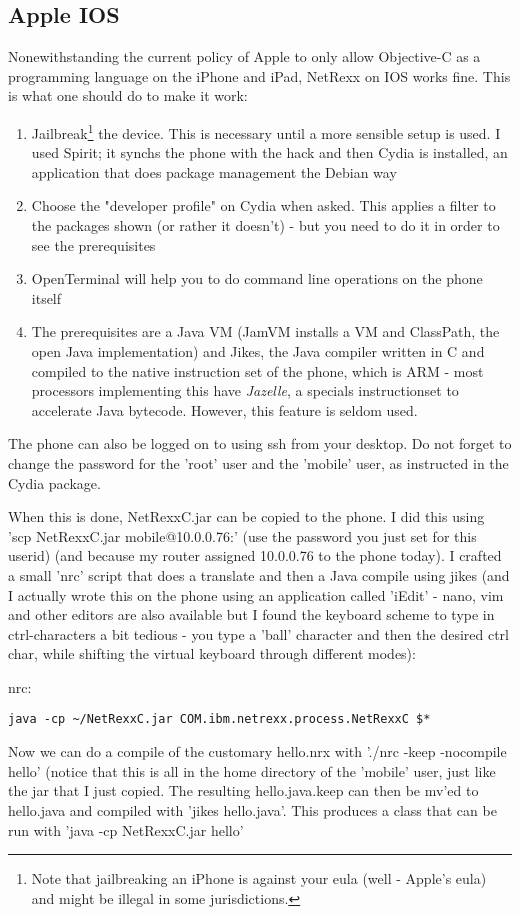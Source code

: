 {{\subsection{Apple IOS}
Nonewithstanding the current policy of Apple to only allow Objective-C
as a programming language on the iPhone and iPad, NetRexx on IOS works fine. This is what one should do to make it work:
\begin{enumerate}
\item Jailbreak\footnote{Note that jailbreaking an iPhone is against your eula (well - Apple's eula) and might be illegal in some jurisdictions.} the device. This is necessary until a more sensible setup is used. I used Spirit; it synchs the phone with the hack and then Cydia is installed, an application that does package management the Debian way
\item Choose the "developer profile" on Cydia when asked. This applies a filter to the packages shown (or rather it doesn't) - but you need to do it in order to see the prerequisites
\item OpenTerminal will help you to do command line operations on the phone itself
\item The prerequisites are a Java VM (JamVM installs a VM and
  ClassPath, the open Java implementation) and Jikes, the Java
  compiler written in C and compiled to the native instruction set of
  the phone, which is ARM - most processors implementing this have
  \emph{Jazelle}, a specials instructionset to accelerate Java
  bytecode. However, this feature is seldom used. 
\end{enumerate}
The phone can also be logged on to using ssh from your desktop. Do not forget to change the password for the 'root' user and the 'mobile' user, as instructed in the Cydia package.

When this is done, NetRexxC.jar can be copied to the phone. I did this using 'scp NetRexxC.jar mobile@10.0.0.76:' (use the password you just set for this userid) (and because my router assigned 10.0.0.76 to the phone today). I crafted a small 'nrc' script that does a translate and then a Java compile using jikes (and I actually wrote this on the phone using an application called 'iEdit' - nano, vim and other editors are also available but I found the keyboard scheme to type in ctrl-characters a bit tedious - you type a 'ball' character and then the desired ctrl char, while shifting the virtual keyboard through different modes):

nrc:
\begin{verbatim}
java -cp ~/NetRexxC.jar COM.ibm.netrexx.process.NetRexxC $*
\end{verbatim}
Now we can do a compile of the customary hello.nrx with './nrc -keep -nocompile hello' (notice that this is all in the home directory of the 'mobile' user, just like the jar that I just copied. The resulting hello.java.keep can then be mv'ed to hello.java and compiled with 'jikes hello.java'. This produces a class that can be run with 'java -cp NetRexxC.jar hello'
}}
